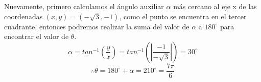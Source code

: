 \vspace{4mm}
Nuevamente, primero calculamos el ángulo auxiliar ${\alpha}$ más cercano al eje x de las coordenadas ${(x,y) = (-\sqrt{3},-1)}$, como el punto se encuentra en el tercer cuadrante, entonces podremos realizar la suma del valor de ${\alpha}$ a ${180^{\circ}}$ para encontrar el valor de ${\theta}$.
\[\alpha = tan^{-1}\left(\frac{y}{x}\right) = tan^{-1}\left( \left|\frac{-1}{-\sqrt{3}}\right| \right) = 30^{\circ}\]
\[\therefore \theta = 180^{\circ} + \alpha = 210^{\circ} = \frac{7\pi}{6}\]
